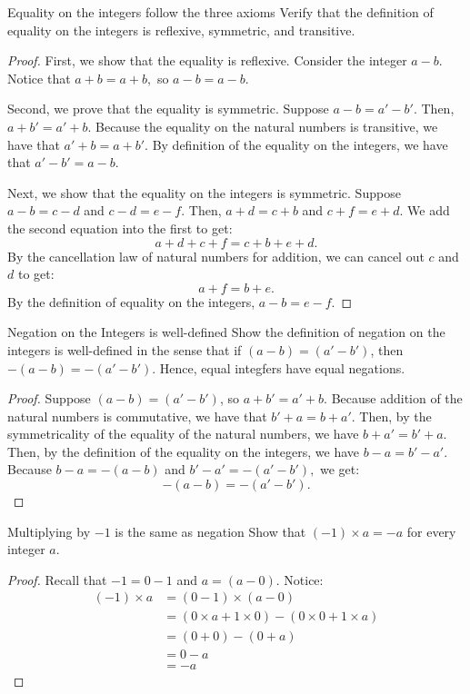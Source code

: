 \begin{problem} {Equality on the integers follow the three axioms}
	Verify that the definition of equality on the integers is reflexive, symmetric, and transitive.
\end{problem}
\begin{proof}
First, we show that the equality is reflexive. Consider the integer $a \minus b.$ 
Notice that $a + b = a + b,$ so $a \minus b = a \minus b.$

Second, we prove that the equality is symmetric. 
Suppose $a \minus b = a' \minus b'$. 
Then, $a + b' = a' + b$. 
Because the equality on the natural numbers is transitive, we have that $a' + b = a + b'$.
By definition of the equality on the integers, we have that $a' \minus b' = a \minus b$.

Next, we show that the equality on the integers is symmetric. 
Suppose $a \minus b = c \minus d$ and $c \minus d = e \minus f$.
Then, $a + d = c + b$ and $c + f = e + d$.
We add the second equation into the first to get:
$$a + d + c + f = c + b + e + d.$$
By the cancellation law of natural numbers for addition, we can cancel out $c$ and $d$ to get:
$$a + f = b + e.$$
By the definition of equality on the integers, $a \minus b = e \minus f$.
\end{proof}

\begin{problem}{Negation on the Integers is well-defined}
Show the definition of negation on the integers is well-defined in the sense that if $(a \minus b) = (a' \minus  b')$, then $-(a \minus b) = -(a' \minus b').$
Hence, equal integfers have equal negations.
\end{problem}
\begin{proof}
Suppose $(a \minus b) = (a' \minus b')$, so $a + b' = a' + b.$ 
Because addition of the natural numbers is commutative, we have that $b' + a = b + a'.$ 
Then, by the symmetricality of the equality of the natural numbers, we have $b + a' = b'+a.$
Then, by the definition of the equality on the integers, we have $b \minus a = b' \minus a'$. 
Because $b \minus a = -(a \minus b)$ and $b' \minus a' = -(a' \minus b'),$ we get:
$$-(a \minus b) = -(a' \minus b').$$
\end{proof}

\begin{problem}{Multiplying by $-1$ is the same as negation}
	Show that $(-1) \times a = -a$ for every integer $a$.
\end{problem}
\begin{proof}
	Recall that $-1 = 0 \minus 1$ and $a = (a \minus 0).$ Notice:
	\begin{align*}
		(-1) \times a &= (0 \minus 1) \times (a \minus 0) \\
		&= (0 \times a + 1 \times 0) \minus (0 \times 0 + 1 \times a) \\
		&= (0 + 0) \minus (0 + a) \\\
		&= 0 \minus a \\
		&= -a
	\end{align*}
\end{proof}

